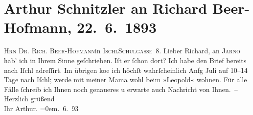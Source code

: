 

         
         \renewcommand{\erwaehntePersonen}{Personen: Richard Beer-Hofmann, Josef Jarno, Louise Schnitzler}
         \renewcommand{\erwaehnteOrte}{Orte: Bad Ischl, Hotel und Pension Rudolfshöhe (Leopold Petter), IX., Alsergrund, Schulgasse, Wien}
         \renewcommand{\erwaehnteWerke}{}
               \section[Arthur Schnitzler an Richard Beer-Hofmann, 22. 6. 1893]{ Arthur Schnitzler an Richard Beer-Hofmann, 22. 6. 1893}\nopagebreak{}\rehead{ }\begin{ledgroupsized}[t]{13cm}\normalsize\beginnumbering \toendnotes[C]{\smallbreak\pagebreak[2]} 
\toendnotes[C]{\smallbreak}\pstart{}{\pb}\textsc{Hrn Dr. Rich. Beer-Hofmann}\pend{}\pstart{}in \textsc{Ischl}\pend{}\pstart{}\textsc{Schulgasse 8}.\pend{}{\bigskip}\pstart
           \noindent{}{\pb}Lieber Richard, an \textsc{Jarno} hab’ ich in Ihrem Sinne geſchrieben. Iſt er ſchon dort? Ich habe den Brief
               bereits nach Iſchl adreſſirt. Im übrigen ko{\geminationm}e ich höchſt wahrſcheinlich Anfg Juli auf
               10–14 Tage nach Iſchl; werde {\pb}mit meiner Mama wohl beim »Leopold« wohnen. Für alle Fälle ſchreib ich Ihnen noch genaueres u erwarte auch
               Nachricht von Ihnen. –\pend
           \pstart
           Herzlich grüßend{\\[\baselineskip]}Ihr \spacefill\mbox{Arthur.}\pend
           \leftskip=0em{}. 6. 93\pend
           
         
         \endnumbering{}\end{ledgroupsized}  \newcommand{\dateiname}{L00226}\newcommand{\titel}{Arthur Schnitzler an Richard Beer-Hofmann, 22. 6. 1893}\newcommand{\editorInnen}{Martin Anton Müller und Gerd-Hermann Susen}
      